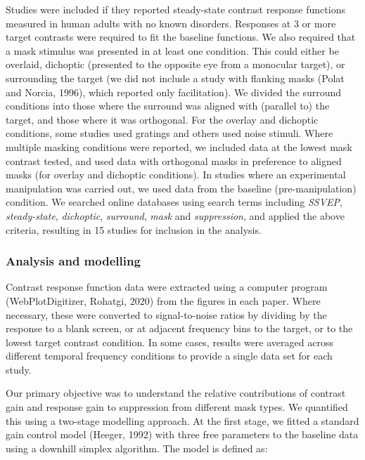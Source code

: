 \documentclass[]{article}
\begin{document}
Studies were included if they reported steady-state contrast response functions measured in human adults with no known disorders. Responses at 3 or more target contrasts were required to fit the baseline functions. We also required that a mask stimulus was presented in at least one condition. This could either be overlaid, dichoptic (presented to the opposite eye from a monocular target), or surrounding the target (we did not include a study with flanking masks (Polat and Norcia, 1996), which reported only facilitation). We divided the surround conditions into those where the surround was aligned with (parallel to) the target, and those where it was orthogonal. For the overlay and dichoptic conditions, some studies used gratings and others used noise stimuli. Where multiple masking conditions were reported, we included data at the lowest mask contrast tested, and used data with orthogonal masks in preference to aligned masks (for overlay and dichoptic conditions). In studies where an experimental manipulation was carried out, we used data from the baseline (pre-manipulation) condition. We searched online databases using search terms including \emph{SSVEP}, \emph{steady-state}, \emph{dichoptic}, \emph{surround}, \emph{mask} and \emph{suppression}, and applied the above criteria, resulting in 15 studies for inclusion in the analysis.

\hypertarget{analysis-and-modelling}{%
\subsubsection{Analysis and modelling}\label{analysis-and-modelling}}

Contrast response function data were extracted using a computer program (WebPlotDigitizer, Rohatgi, 2020) from the figures in each paper. Where necessary, these were converted to signal-to-noise ratios by dividing by the response to a blank screen, or at adjacent frequency bins to the target, or to the lowest target contrast condition. In some cases, results were averaged across different temporal frequency conditions to provide a single data set for each study.

Our primary objective was to understand the relative contributions of contrast gain and response gain to suppression from different mask types. We quantified this using a two-stage modelling approach. At the first stage, we fitted a standard gain control model (Heeger, 1992) with three free parameters to the baseline data using a downhill simplex algorithm. The model is defined as:
\end{document}
